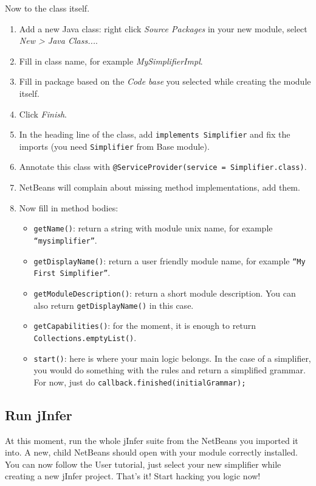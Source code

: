 \documentclass[a4paper,10pt,oneside]{article}
\begin{document}
\par 
\noindent Now to the class itself.
\begin{enumerate}
  \item Add a new Java class: right click \textit{Source Packages} in your new
      module, select \textit{New > Java Class...}.
  \item Fill in class name, for example \textit{MySimplifierImpl}.
  \item Fill in package based on the \textit{Code base} you selected while creating
      the module itself.
  \item Click \textit{Finish}.
  \item In the heading line of the class, add \texttt{implements Simplifier} and
      fix the imports (you need \texttt{Simplifier} from Base module).
  \item Annotate this class with \texttt{@ServiceProvider(service = Simplifier.class)}.
  \item NetBeans will complain about missing method implementations, add them.
  \item 
    Now fill in method bodies:
    \begin{itemize}
      \item \texttt{getName()}: return a string with module unix name, for example \texttt{``mysimplifier''}.
      \item \texttt{getDisplayName()}: return a user friendly module name, for example \texttt{``My First Simplifier''}.
      \item \texttt{getModuleDescription()}: return a short module description. You can also return \texttt{getDisplayName()} in this case.
      \item \texttt{getCapabilities()}: for the moment, it is enough to return \texttt{Collections.emptyList()}.
      \item \texttt{start()}: here is where your main logic belongs. In the case of a simplifier, you would do something with the rules and return a simplified grammar. For now, just do \texttt{callback.finished(initialGrammar);}
    \end{itemize}
  
\end{enumerate}

\subsection*{Run jInfer}
\par 
  At this moment, run the whole jInfer suite from the NetBeans you imported it into.
  A new, child NetBeans should open with your module correctly installed. You can
  now follow the User tutorial, just select your new
  simplifier while creating a new jInfer project.
  That's it! Start hacking you logic now!
\end{document}
